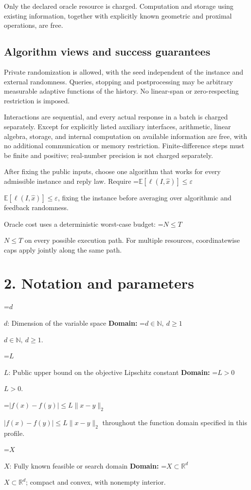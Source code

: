 \documentclass[10pt,a4paper]{article}
\newcommand{\AtlasMath}[1]{\par\begingroup\centering\setbox0=\hbox{$\displaystyle #1$}\ifdim\wd0>1.4\linewidth\typeout{ATLAS WIDE FORMULA: \the\wd0}\fi\ifdim\wd0>\linewidth\resizebox{\linewidth}{!}{\box0}\else\box0\fi\par\endgroup}
\newcommand{\AtlasInlineMath}[1]{\begingroup\setbox0=\hbox{$#1$}\ifdim\wd0>.4\linewidth\endgroup\AtlasMath{#1}\else\endgroup$#1$\fi}
\begin{document}
Only the declared oracle resource is charged. Computation and storage using existing information, together with explicitly known geometric and proximal operations, are free.

\subsection{Algorithm views and success guarantees}
Private randomization is allowed, with the seed independent of the instance and external randomness. Queries, stopping and postprocessing may be arbitrary measurable adaptive functions of the history. No linear-span or zero-respecting restriction is imposed.

Interactions are sequential, and every actual response in a batch is charged separately. Except for explicitly listed auxiliary interfaces, arithmetic, linear algebra, storage, and internal computation on available information are free, with no additional communication or memory restriction. Finite-difference steps must be finite and positive; real-number precision is not charged separately.

After fixing the public inputs, choose one algorithm that works for every admissible instance and reply law. Require \AtlasInlineMath{\mathbb{E}[\ell(I,\widehat{x})]\le \varepsilon}, fixing the instance before averaging over algorithmic and feedback randomness.

Oracle cost uses a deterministic worst-case budget: \AtlasInlineMath{N\le T} on every possible execution path. For multiple resources, coordinatewise caps apply jointly along the same path.

\section{2. Notation and parameters}
\AtlasInlineMath{d}: Dimension of the variable space \textbf{Domain:} \AtlasInlineMath{d\in\mathbb{N},\ d\ge1}.

\AtlasInlineMath{L}: Public upper bound on the objective Lipschitz constant \textbf{Domain:} \AtlasInlineMath{L>0}.

\AtlasInlineMath{|f(x)-f(y)|\le L\|x-y\|_2} throughout the function domain specified in this profile.

\AtlasInlineMath{X}: Fully known feasible or search domain \textbf{Domain:} \AtlasInlineMath{X\subset\mathbb{R}^d}; compact and convex, with nonempty interior.
\end{document}
